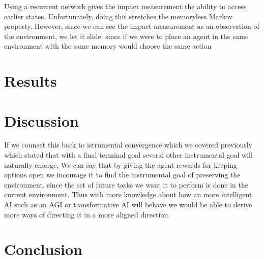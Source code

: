 \documentclass[12pt,A4]{report}
\theoremstyle{definition}
\begin{document}
Using a recurrent network gives the impact measurement the ability to access earlier states. Unfortunately, doing this stretches the memoryless Markov property. However, since we can see the impact measurement as an observation of the environment, we let it slide. since if we were to place an agent in the same environment with the same memory would choose the same action


\chapter{Results}




\chapter{Discussion}
If we connect this back to istrumental convergence which we covered previously which stated that with a final terminal goal several other instrumental goal will naturally emerge. We can say that by giving the agent rewards for keeping options open we incourage it to find the instrumental goal of preserving the environment, since the set of future tasks we want it to perform is done in the current environment. Thus with more knowledge about how an more intelligent AI such as an AGI or transformative AI will behave we would be able to derive more ways of directing it in a more aligned direction.







\chapter{Conclusion}




\end{document}
